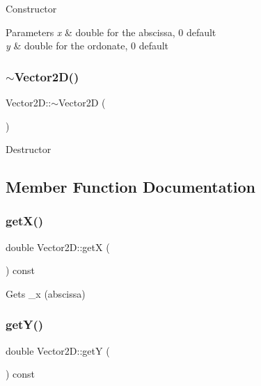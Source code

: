 Constructor 
\begin{DoxyParams}{Parameters}
{\em x} & double for the abscissa, 0 default \\
\hline
{\em y} & double for the ordonate, 0 default \\
\hline
\end{DoxyParams}
\hypertarget{class_vector2_d_ac0f819527d3966874c4c9bb72ab9f67e}{}\label{class_vector2_d_ac0f819527d3966874c4c9bb72ab9f67e} 
\subsubsection{\texorpdfstring{$\sim$\+Vector2\+D()}{~Vector2D()}}
{\footnotesize\ttfamily Vector2\+D\+::$\sim$\+Vector2D (\begin{DoxyParamCaption}{ }\end{DoxyParamCaption})\hspace{0.3cm}{\ttfamily [virtual]}}

Destructor 

\subsection{Member Function Documentation}
\hypertarget{class_vector2_d_a5957acade3579baa63807d625316d557}{}\label{class_vector2_d_a5957acade3579baa63807d625316d557} 
\subsubsection{\texorpdfstring{get\+X()}{getX()}}
{\footnotesize\ttfamily double Vector2\+D\+::getX (\begin{DoxyParamCaption}{ }\end{DoxyParamCaption}) const\hspace{0.3cm}{\ttfamily [inline]}}

Gets \+\_\+x (abscissa) \hypertarget{class_vector2_d_a4ae19b97cfbc35850b9717a25ea83104}{}\label{class_vector2_d_a4ae19b97cfbc35850b9717a25ea83104} 
\subsubsection{\texorpdfstring{get\+Y()}{getY()}}
{\footnotesize\ttfamily double Vector2\+D\+::getY (\begin{DoxyParamCaption}{ }\end{DoxyParamCaption}) const\hspace{0.3cm}{\ttfamily [inline]}}

